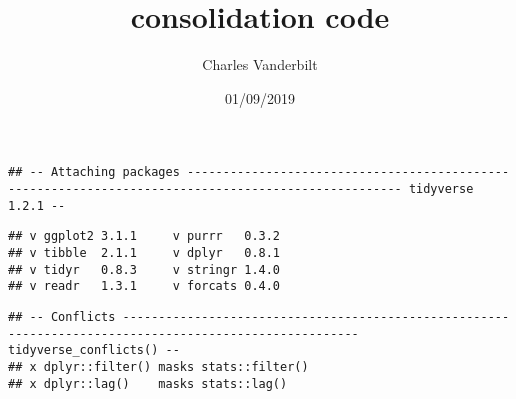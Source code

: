 \documentclass[]{article}
\title{consolidation code}
\author{Charles Vanderbilt}
\date{01/09/2019}
\newenvironment{Shaded}{\begin{snugshade}}{\end{snugshade}}
\newcommand{\KeywordTok}[1]{\textcolor[rgb]{0.13,0.29,0.53}{\textbf{#1}}}
\newcommand{\DataTypeTok}[1]{\textcolor[rgb]{0.13,0.29,0.53}{#1}}
\newcommand{\StringTok}[1]{\textcolor[rgb]{0.31,0.60,0.02}{#1}}
\newcommand{\OtherTok}[1]{\textcolor[rgb]{0.56,0.35,0.01}{#1}}
\newcommand{\ControlFlowTok}[1]{\textcolor[rgb]{0.13,0.29,0.53}{\textbf{#1}}}
\newcommand{\OperatorTok}[1]{\textcolor[rgb]{0.81,0.36,0.00}{\textbf{#1}}}
\newcommand{\NormalTok}[1]{#1}
\begin{document}
\maketitle

\begin{Shaded}
\end{Shaded}

\begin{verbatim}
## -- Attaching packages ---------------------------------------------------------------------------------------------------- tidyverse 1.2.1 --
\end{verbatim}

\begin{verbatim}
## v ggplot2 3.1.1     v purrr   0.3.2
## v tibble  2.1.1     v dplyr   0.8.1
## v tidyr   0.8.3     v stringr 1.4.0
## v readr   1.3.1     v forcats 0.4.0
\end{verbatim}

\begin{verbatim}
## -- Conflicts ------------------------------------------------------------------------------------------------------- tidyverse_conflicts() --
## x dplyr::filter() masks stats::filter()
## x dplyr::lag()    masks stats::lag()
\end{verbatim}
\end{document}
